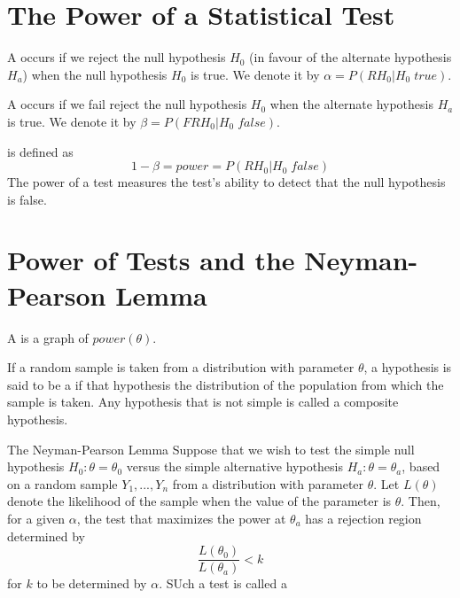 \documentclass[12pt, a4paper, twoside, openright, titlepage]{book}
\begin{document}
\section{\textsection The Power of a Statistical Test}


\begin{defn}{}{}
    A  occurs if we reject the null hypothesis $H_0$ (in favour of the alternate hypothesis $H_a$) when the null hypothesis $H_0$ is true. We denote it by $\alpha = P(RH_0\vert H_0\;true)$.
\end{defn}

\begin{defn}{}{}
    A  occurs if we fail reject the null hypothesis $H_0$ when the alternate hypothesis $H_a$ is true. We denote it by $\beta = P(FRH_0\vert H_0\;false)$.
\end{defn}


\begin{defn}{}{}
     is defined as \begin{equation*}
        1-\beta = power = P(RH_0\vert H_0\;false)
    \end{equation*}
    The power of a test measures the test's ability to detect that the null hypothesis is false.
\end{defn}


\section{\textsection Power of Tests and the Neyman-Pearson Lemma}

A  is a graph of $power(\theta)$.

\begin{defn}{}{}
    If a random sample is taken from a distribution with parameter $\theta$, a hypothesis is said to be a  if that hypothesis  the distribution of the population from which the sample is taken. Any hypothesis that is not simple is called a composite hypothesis.
\end{defn}

\begin{namthm}{The Neyman-Pearson Lemma}{}
    Suppose that we wish to test the simple null hypothesis $H_0:\theta = \theta_0$ versus the simple alternative hypothesis $H_a:\theta = \theta_a$, based on a random sample $Y_1,...,Y_n$ from a distribution with parameter $\theta$. Let $L(\theta)$ denote the likelihood of the sample when the value of the parameter is $\theta$. Then, for a given $\alpha$, the test that maximizes the power at $\theta_a$ has a rejection region determined by \begin{equation*}
        \frac{L(\theta_0)}{L(\theta_a)} < k
    \end{equation*}
    for $k$ to be determined by $\alpha$. SUch a test is called a 
\end{namthm}
\end{document}
